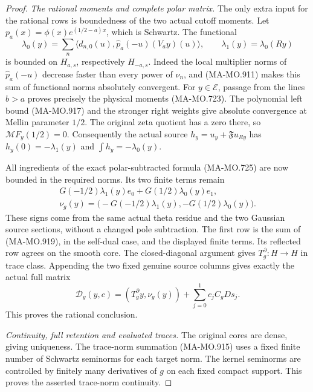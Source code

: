 \begin{proof}
\emph{The rational moments and complete polar matrix.}
The only extra input for the rational
rows is boundedness of the two actual
cutoff moments. Let
\(p_a(x)=\phi(x)e^{(1/2-a)x}\), which
is Schwartz. The functional
\[
 \lambda_0(y)=
       \sum_n\big\langle d_{n,0}(u),
              \widehat p_a(-u)(V_ay)(u)\big\rangle,
                   \qquad\lambda_1(y)=\lambda_0(Ry)
 \tag{MA-MO.920}
\]
is bounded on \(H_{a,s}\), respectively
\(H_{-a,s}\). Indeed the local multiplier
norms of \(\widehat p_a(-u)\) decrease
faster than every power of \(\nu_n\),
and (MA-MO.911) makes this sum of
functional norms absolutely convergent.
For \(y\in\mathcal E\), passage from
the lines \(b>a\) proves precisely
the physical moments (MA-MO.723).
The polynomial left bound
(MA-MO.917) and the stronger right
weights give absolute convergence
at Mellin parameter \(1/2\).
The original zeta quotient has a
zero there, so
\(\mathcal MF_y(1/2)=0\).
Consequently the actual source
\(h_y=u_y+\mathfrak F u_{Ry}\)
has \(h_y(0)=-\lambda_1(y)\) and
\(\int h_y=-\lambda_0(y)\).

All ingredients of the exact
polar-subtracted formula (MA-MO.725)
are now bounded in the required
norms. Its two finite terms remain
\[
 \begin{gathered}
 G(-1/2)\lambda_1(y)e_0+
                   G(1/2)\lambda_0(y)e_1,\\
 \nu_g(y)=
   \bigl(-G(-1/2)\lambda_1(y),
         -G(1/2)\lambda_0(y)\bigr).
 \end{gathered}
 \tag{MA-MO.921}
\]
These signs come from the same
actual theta residue and the two
Gaussian source sections, without
a changed pole subtraction.
The first row is the sum of
(MA-MO.919), in the self-dual case,
and the displayed finite terms.
Its reflected row agrees on the
smooth core. The closed-diagonal
argument gives \(T_g^\partial:H\to H\)
in trace class. Appending the two
fixed genuine source columns gives
exactly the actual full matrix
\[
 \mathscr D_g(y,c)
       =(T_g^\partial y,\nu_g(y))
                             +\sum_{j=0}^1 c_jC_gDs_j .
 \tag{MA-MO.922}
\]
This proves the rational conclusion.

\emph{Continuity, full retention and evaluated traces.}
The original cores are dense, giving
uniqueness. The trace-norm summation
(MA-MO.915) uses a fixed finite
number of Schwartz seminorms for
each target norm. The kernel
seminorms are controlled by finitely
many derivatives of \(g\) on each
fixed compact support. This proves
the asserted trace-norm continuity.


\end{proof}

